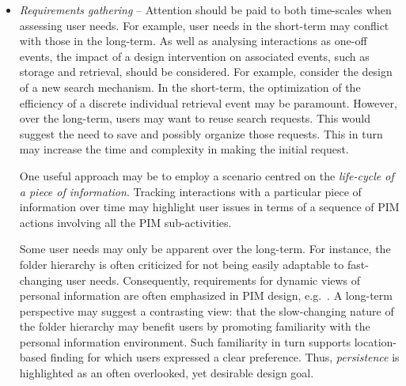 \begin{itemize}

\item \textit{Requirements gathering} -- Attention should be paid to both time-scales when assessing user needs.  For example, user needs in the short-term may conflict with those in the long-term. As well as analysing interactions as one-off events, the impact of a design intervention on associated events, such as storage and retrieval, should be considered.   For example, consider the design of a new search mechanism.  In the short-term, the optimization of the efficiency of a discrete individual retrieval event may be paramount.  However, over the long-term, users may want to reuse search requests. This would suggest the need to save and possibly organize those requests. This in turn may increase the time and complexity in making the initial request.

One useful approach may be to employ a scenario centred on the \textit{life-cycle of a piece of information}.  Tracking interactions with a particular piece of information over time may highlight user issues in terms of a sequence of PIM actions involving all the PIM sub-activities.  

Some user needs may only be apparent over the long-term.  For instance, the folder hierarchy is often criticized for not being easily adaptable to fast-changing user needs.  Consequently, requirements for dynamic views of personal information are often emphasized in PIM design, e.g.~\citep{dourish:99a,Dumais:03a}.  A long-term perspective may suggest a contrasting view: that the slow-changing nature of the folder hierarchy may
benefit users by promoting familiarity with the personal information environment. Such familiarity in turn supports location-based finding for which users expressed a clear preference.  Thus, \textit{persistence} is highlighted as an often overlooked, yet desirable design goal.  %



\end{itemize}
